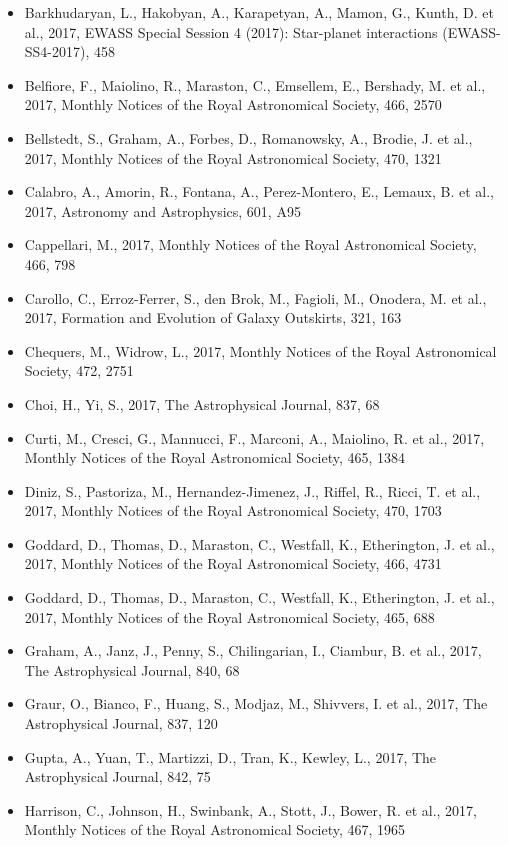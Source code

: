 \documentclass{letter}
\begin{document}
\begin{enumerate}
\begin{itemize}
\item Barkhudaryan, L., Hakobyan, A., Karapetyan, A., Mamon, G., Kunth, D. et al., 2017, EWASS Special Session 4 (2017): Star-planet interactions (EWASS-SS4-2017), 458
\item Belfiore, F., Maiolino, R., Maraston, C., Emsellem, E., Bershady, M. et al., 2017, Monthly Notices of the Royal Astronomical Society, 466, 2570
\item Bellstedt, S., Graham, A., Forbes, D., Romanowsky, A., Brodie, J. et al., 2017, Monthly Notices of the Royal Astronomical Society, 470, 1321
\item Calabro, A., Amorin, R., Fontana, A., Perez-Montero, E., Lemaux, B. et al., 2017, Astronomy and Astrophysics, 601, A95
\item Cappellari, M., 2017, Monthly Notices of the Royal Astronomical Society, 466, 798
\item Carollo, C., Erroz-Ferrer, S., den Brok, M., Fagioli, M., Onodera, M. et al., 2017, Formation and Evolution of Galaxy Outskirts, 321, 163
\item Chequers, M., Widrow, L., 2017, Monthly Notices of the Royal Astronomical Society, 472, 2751
\item Choi, H., Yi, S., 2017, The Astrophysical Journal, 837, 68
\item Curti, M., Cresci, G., Mannucci, F., Marconi, A., Maiolino, R. et al., 2017, Monthly Notices of the Royal Astronomical Society, 465, 1384
\item Diniz, S., Pastoriza, M., Hernandez-Jimenez, J., Riffel, R., Ricci, T. et al., 2017, Monthly Notices of the Royal Astronomical Society, 470, 1703
\item Goddard, D., Thomas, D., Maraston, C., Westfall, K., Etherington, J. et al., 2017, Monthly Notices of the Royal Astronomical Society, 466, 4731
\item Goddard, D., Thomas, D., Maraston, C., Westfall, K., Etherington, J. et al., 2017, Monthly Notices of the Royal Astronomical Society, 465, 688
\item Graham, A., Janz, J., Penny, S., Chilingarian, I., Ciambur, B. et al., 2017, The Astrophysical Journal, 840, 68
\item Graur, O., Bianco, F., Huang, S., Modjaz, M., Shivvers, I. et al., 2017, The Astrophysical Journal, 837, 120
\item Gupta, A., Yuan, T., Martizzi, D., Tran, K., Kewley, L., 2017, The Astrophysical Journal, 842, 75
\item Harrison, C., Johnson, H., Swinbank, A., Stott, J., Bower, R. et al., 2017, Monthly Notices of the Royal Astronomical Society, 467, 1965

\end{itemize}
\end{enumerate}
\end{document}
